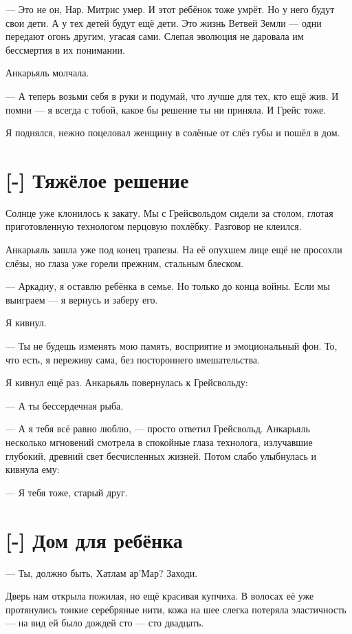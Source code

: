 --- Это не он, Нар.
Митрис умер.
И этот ребёнок тоже умрёт.
Но у него будут свои дети.
А у тех детей будут ещё дети.
Это жизнь Ветвей Земли --- одни передают огонь другим, угасая сами.
Слепая эволюция не даровала им бессмертия в их понимании.

Анкарьяль молчала.

--- А теперь возьми себя в руки и подумай, что лучше для тех, кто ещё жив.
И помни --- я всегда с тобой, какое бы решение ты ни приняла.
И Грейс тоже.

Я поднялся, нежно поцеловал женщину в солёные от слёз губы и пошёл в дом.

\section{[-] Тяжёлое решение}

Солнце уже клонилось к закату.
Мы с Грейсвольдом сидели за столом, глотая приготовленную технологом перцовую похлёбку.
Разговор не клеился.

Анкарьяль зашла уже под конец трапезы.
На её опухшем лице ещё не просохли слёзы, но глаза уже горели прежним, стальным блеском.

--- Аркадиу, я оставлю ребёнка в семье.
Но только до конца войны.
Если мы выиграем --- я вернусь и заберу его.

Я кивнул.

--- Ты не будешь изменять мою память, восприятие и эмоциональный фон.
То, что есть, я переживу сама, без постороннего вмешательства.

Я кивнул ещё раз.
Анкарьяль повернулась к Грейсвольду:

--- А ты бессердечная рыба.

--- А я тебя всё равно люблю, --- просто ответил Грейсвольд.
Анкарьяль несколько мгновений смотрела в спокойные глаза технолога, излучавшие глубокий, древний свет бесчисленных жизней.
Потом слабо улыбнулась и кивнула ему:

--- Я тебя тоже, старый друг.

\section{[-] Дом для ребёнка}

--- Ты, должно быть, Хатлам ар’Мар?
Заходи.

Дверь нам открыла пожилая, но ещё красивая купчиха.
В волосах её уже протянулись тонкие серебряные нити, кожа на шее слегка потеряла эластичность --- на вид ей было дождей сто --- сто двадцать.

